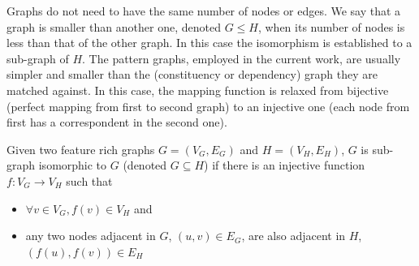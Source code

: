 
Graphs do not need to have the same number of nodes or edges. We say that a graph is smaller than another one, denoted $G \leq H$, when its number of nodes is less than that of the other graph. In this case the isomorphism is established to a sub-graph of $H$. 
The pattern graphs, employed in the current work, are usually simpler and smaller than the (constituency or dependency) graph they are matched against. 
In this case, the mapping function is relaxed from bijective (perfect mapping from first to second graph) to an injective one (each node from first has a correspondent in the second one).

\begin{definition}\label{def:sgisomorphism}
       Given two feature rich graphs $G=(V_G,E_G)$ and $H=(V_H,E_H)$, $G$ is sub-graph isomorphic to $G$ (denoted $G \subseteq H$) if there is an injective function $f:V_G \rightarrow V_H$ such that
   \begin{itemize}
       \item $\forall v \in V_G, f(v) \in V_H$ and
       \item any two nodes adjacent in $G$, $(u,v) \in E_G$, are also adjacent in $H$, $(f(u), f(v)) \in E_H $
   \end{itemize}
\end{definition}


